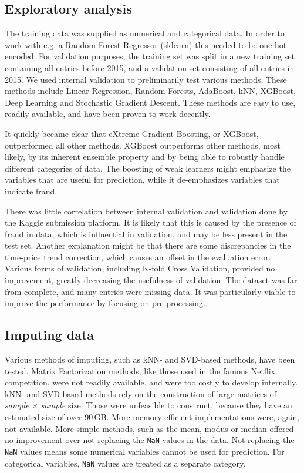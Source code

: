 \documentclass[a4paper,11pt,twocolumn]{article}
\begin{document}
\subsection{Exploratory analysis}
The training data was supplied as numerical and categorical data. In order to
work with e.g. a Random Forest Regressor (sklearn) this needed to be one-hot
encoded. For validation purposes, the training set was split in a new training
set containing all entries before 2015, and a validation set consisting of all
entries in 2015. We used internal validation to preliminarily test various
methods. These methods include Linear Regression, Random Forests, AdaBoost, kNN,
XGBoost, Deep Learning and Stochastic Gradient Descent. These methods are easy
to use, readily available, and have been proven to work decently.

It quickly became clear that eXtreme Gradient Boosting, or XGBoost, outperformed
all other methods. XGBoost outperforms other methods, most likely, by its
inherent ensemble property and by being able to robustly handle different
categories of data. The boosting of weak learners might emphasize the variables
that are useful for prediction, while it de-emphasizes variables that indicate
fraud.

There was little correlation between internal validation and validation done by
the Kaggle submission platform. It is likely that this is caused by the
presence of fraud in data, which is influential in validation, and may be less
present in the test set. Another explanation might be that there are some
discrepancies in the time-price trend correction, which causes an offset in the
evaluation error. Various forms of validation, including K-fold Cross
Validation, provided no improvement, greatly decreasing the usefulness of
validation. The dataset was far from complete, and many entries were missing
data. It was particularly viable to improve the performance by focusing on
pre-processing.

\subsection{Imputing data}
Various methods of imputing, such as kNN- and SVD-based methods, have been
tested. Matrix Factorization methods, like those used in the famous Netflix
competition, were not readily available, and were too costly to develop
internally. kNN- and SVD-based methods rely on the construction of large
matrices of \emph{sample} $\times$ \emph{sample} size. Those were unfeasible to construct,
because they have an estimated size of over 90\,GB. More memory-efficient
implementations were, again, not available. More simple methods, such as the
mean, modus or median offered no improvement over not replacing the \texttt{NaN}
values in the data. Not replacing the \texttt{NaN} values means some numerical
variables cannot be used for prediction. For categorical variables,
\texttt{NaN} values are treated as a separate category.
\end{document}
